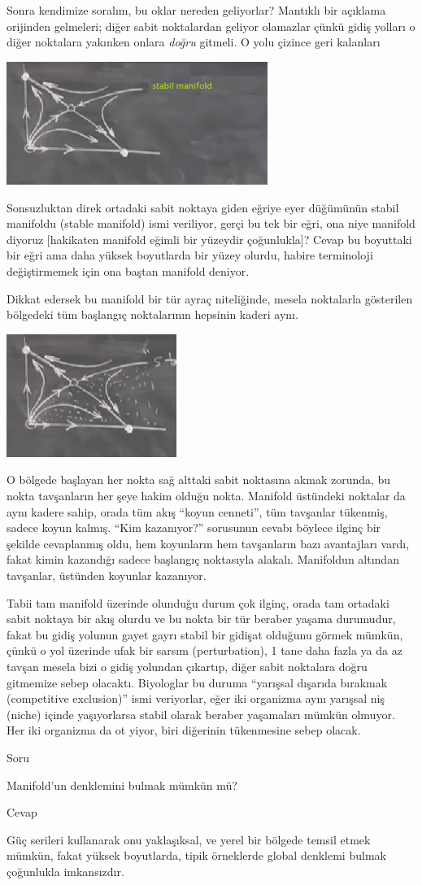 \documentclass[12pt,fleqn]{article}\usepackage{../../common}
\begin{document}
Sonra kendimize soralım, bu oklar nereden geliyorlar? Mantıklı bir açıklama
orijinden gelmeleri; diğer sabit noktalardan geliyor olamazlar çünkü gidiş
yolları o diğer noktalara yakınken onlara {\em doğru} gitmeli. O yolu çizince
geri kalanları

\includegraphics[height=4cm]{06_13.png}

Sonsuzluktan direk ortadaki sabit noktaya giden eğriye eyer düğümünün stabil
manifoldu (stable manifold) ismi veriliyor, gerçi bu tek bir eğri, ona niye
manifold diyoruz [hakikaten manifold eğimli bir yüzeydir çoğunlukla]? Cevap bu
boyuttaki bir eğri ama daha yüksek boyutlarda bir yüzey olurdu, habire
terminoloji değiştirmemek için ona baştan manifold deniyor.

Dikkat edersek bu manifold bir tür ayraç niteliğinde, mesela noktalarla
gösterilen bölgedeki tüm başlangıç noktalarının hepsinin kaderi aynı.

\includegraphics[height=4cm]{06_14.png}

O bölgede başlayan her nokta sağ alttaki sabit noktasına akmak zorunda, bu nokta
tavşanların her şeye hakim olduğu nokta. Manifold üstündeki noktalar da aynı
kadere sahip, orada tüm akış ``koyun cenneti'', tüm tavşanlar tükenmiş, sadece
koyun kalmış. ``Kim kazanıyor?'' sorusunun cevabı böylece ilginç bir şekilde
cevaplanmış oldu, hem koyunların hem tavşanların bazı avantajları vardı, fakat
kimin kazandığı sadece başlangıç noktasıyla alakalı. Manifoldun altından
tavşanlar, üstünden koyunlar kazanıyor.

Tabii tam manifold üzerinde olunduğu durum çok ilginç, orada tam ortadaki sabit
noktaya bir akış olurdu ve bu nokta bir tür beraber yaşama durumudur, fakat bu
gidiş yolunun gayet gayrı stabil bir gidişat olduğunu görmek mümkün, çünkü o yol
üzerinde ufak bir sarsım (perturbation), 1 tane daha fazla ya da az tavşan
mesela bizi o gidiş yolundan çıkartıp, diğer sabit noktalara doğru gitmemize
sebep olacaktı. Biyologlar bu duruma ``yarışsal dışarıda bırakmak (competitive
exclusion)'' ismi veriyorlar, eğer iki organizma aynı yarışsal niş (niche)
içinde yaşıyorlarsa stabil olarak beraber yaşamaları mümkün olmuyor. Her iki
organizma da ot yiyor, biri diğerinin tükenmesine sebep olacak.

Soru

Manifold'un denklemini bulmak mümkün mü?

Cevap

Güç serileri kullanarak onu yaklaşıksal, ve yerel bir bölgede temsil etmek
mümkün, fakat yüksek boyutlarda, tipik örneklerde global denklemi bulmak
çoğunlukla imkansızdır.
\end{document}
